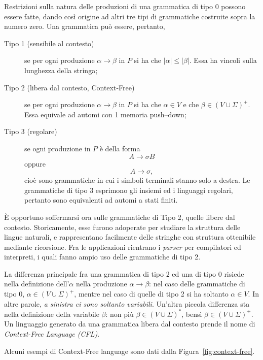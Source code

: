 \documentclass[10pt]{\classname}
\theoremstyle{definition}
\theoremstyle{definition}
\begin{document}
Restrizioni sulla natura delle produzioni di una grammatica di tipo 0 possono
essere fatte, dando così origine ad altri tre tipi di grammatiche costruite
sopra la numero zero. Una grammatica può essere, pertanto,
\begin{description}
    \item[Tipo 1 (sensibile al contesto)] se per ogni produzione $\alpha
        \rightarrow \beta$ in $P$ si ha che $|\alpha| \leq |\beta|$. Essa ha
        vincoli sulla lunghezza della stringa;
    \item[Tipo 2 (libera dal contesto, Context-Free)] se per ogni produzione
        $\alpha \rightarrow \beta$ in $P$ si ha che $\alpha \in V$ e che $\beta
        \in (V \cup \Sigma)^+$. Essa equivale ad automi con 1 memoria
        push--down;
    \item[Tipo 3 (regolare)] se ogni produzione in $P$ è della forma $$A
        \rightarrow \sigma B$$ oppure $$A \rightarrow \sigma,$$ cioè sono
        grammatiche in cui i simboli terminali stanno solo a destra. Le
        grammatiche di tipo 3 esprimono gli insiemi ed i linguaggi regolari,
        pertanto sono equivalenti ad automi a stati finiti.
\end{description}

È opportuno soffermarsi ora sulle grammatiche di Tipo 2, quelle libere dal
contesto. Storicamente, esse furono adoperate per studiare la struttura delle
lingue naturali, e rappresentano facilmente delle stringhe con struttura
ottenibile mediante ricorsione. Fra le applicazioni rientrano i \emph{parser}
per compilatori ed interpreti, i quali fanno ampio uso delle grammatiche di
tipo 2.

La differenza principale fra una grammatica di tipo 2 ed una di tipo 0 risiede
nella definizione dell'$\alpha$ nella produzione $\alpha \rightarrow \beta$:
nel caso delle grammatiche di tipo 0, $\alpha \in (V \cup \Sigma)^+$, mentre
nel caso di quelle di tipo 2 si ha soltanto $\alpha \in V$. In altre parole,
\emph{a sinistra ci sono soltanto variabili}. Un'altra piccola differenza sta
nella definizione della variabile $\beta$: non più $\beta \in (V \cup
\Sigma)^*$, bensì $\beta \in (V \cup \Sigma)^+$. Un linguaggio generato da una
grammatica libera dal contesto prende il nome di \emph{Context-Free Language
(CFL)}.

Alcuni esempi di Context-Free language sono dati dalla
Figura~\ref{fig:context-free}.
\end{document}
